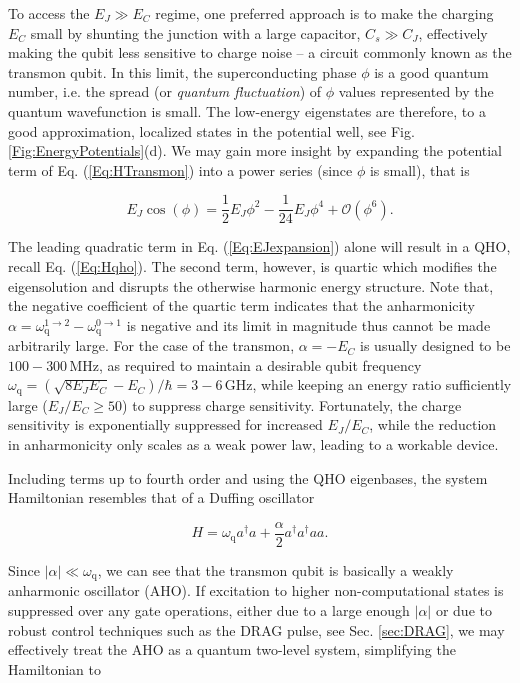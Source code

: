 \documentclass[aip,apr,twocolumn,showpacs,superscriptaddress,groupedaddress,nofootinbib,reprint]{revtex4-1}  %
\newcommand{\freq}{\omega_\text{q}}
\begin{document}
To access the $E_J \gg E_C$ regime, one preferred approach is to make the charging $E_C$ small by shunting the junction with a large capacitor, $C_s \gg C_J$, effectively making the qubit less sensitive to charge noise -- a circuit commonly known as the transmon qubit\cite{Koch2007}. In this limit, the superconducting phase $\phi$ is a good quantum number, i.e. the spread (or \textit{quantum fluctuation}) of $\phi$ values represented by the quantum wavefunction is small. The low-energy eigenstates are therefore, to a good approximation, localized states in the potential well, see Fig. \ref{Fig:EnergyPotentials}(d). We may gain more insight by expanding the potential term of Eq. (\ref{Eq:HTransmon}) into a power series (since $\phi$ is small), that is

\begin{equation}
E_J \cos(\phi) = \frac{1}{2}E_J \phi^2 - \frac{1}{24}E_J \phi^4 + \mathcal{O}(\phi^6).
\label{Eq:EJexpansion}
\end{equation}

The leading quadratic term in Eq. (\ref{Eq:EJexpansion}) alone will result in a QHO, recall Eq. (\ref{Eq:Hqho}). The second term, however, is quartic which modifies the eigensolution and disrupts the otherwise harmonic energy structure. Note that, the negative coefficient of the quartic term indicates that the anharmonicity $\alpha = \omega_{\text{q}}^{1\rightarrow 2} - \omega_{\text{q}}^{0\rightarrow 1}$ is negative and its limit in magnitude thus cannot be made arbitrarily large. For the case of the transmon, $\alpha = - E_C$ is usually designed to be $100 - 300\,$MHz, as required to maintain a desirable qubit frequency $\freq = (\sqrt{8 E_J E_C} - E_C)/\hbar = 3-6\,$GHz, while keeping an energy ratio sufficiently large ($E_J/E_C \geq 50$) to suppress charge sensitivity\cite{Koch2007}. Fortunately, the charge sensitivity is exponentially suppressed for increased $E_J/E_C$, while the reduction in anharmonicity only scales as a weak power law, leading to a workable device.

Including terms up to fourth order and using the QHO eigenbases, the system Hamiltonian resembles that of a Duffing oscillator

\begin{equation}
H = \freq a^{\dagger}a + \frac{\alpha}{2}a^{\dagger}a^{\dagger}aa.
\label{Eq:HDuffing}
\end{equation}

Since $|\alpha| \ll \freq$, we can see that the transmon qubit is basically a weakly anharmonic oscillator (AHO). If excitation to higher non-computational states is suppressed over any gate operations, either due to a large enough  $|\alpha|$ or due to robust control techniques such as the DRAG pulse, see Sec. \ref{sec:DRAG}, we may effectively treat the AHO as a quantum two-level system, simplifying the Hamiltonian to
\end{document}
